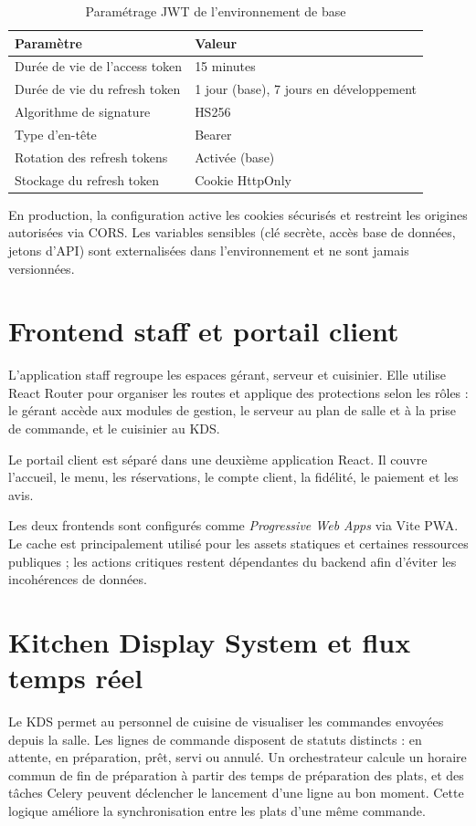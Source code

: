 \begin{table}[H]
\centering
\caption{Paramétrage JWT de l'environnement de base}
\begin{tabular}{p{6cm}p{7cm}}
\toprule
\textbf{Paramètre} & \textbf{Valeur} \\
\midrule
Durée de vie de l'access token & 15 minutes \\
Durée de vie du refresh token & 1 jour (base), 7 jours en développement \\
Algorithme de signature & HS256 \\
Type d'en-tête & Bearer \\
Rotation des refresh tokens & Activée (base) \\
Stockage du refresh token & Cookie HttpOnly \\
\bottomrule
\end{tabular}
\end{table}

En production, la configuration active les cookies sécurisés et restreint les origines autorisées via CORS. Les variables sensibles (clé secrète, accès base de données, jetons d'API) sont externalisées dans l'environnement et ne sont jamais versionnées.

\section{Frontend staff et portail client}
L'application staff regroupe les espaces gérant, serveur et cuisinier. Elle utilise React Router pour organiser les routes et applique des protections selon les rôles : le gérant accède aux modules de gestion, le serveur au plan de salle et à la prise de commande, et le cuisinier au KDS.

Le portail client est séparé dans une deuxième application React. Il couvre l'accueil, le menu, les réservations, le compte client, la fidélité, le paiement et les avis.

Les deux frontends sont configurés comme \emph{Progressive Web Apps} via Vite PWA. Le cache est principalement utilisé pour les assets statiques et certaines ressources publiques ; les actions critiques restent dépendantes du backend afin d'éviter les incohérences de données.

\section{Kitchen Display System et flux temps réel}
Le KDS permet au personnel de cuisine de visualiser les commandes envoyées depuis la salle. Les lignes de commande disposent de statuts distincts : en attente, en préparation, prêt, servi ou annulé. Un orchestrateur calcule un horaire commun de fin de préparation à partir des temps de préparation des plats, et des tâches Celery peuvent déclencher le lancement d'une ligne au bon moment. Cette logique améliore la synchronisation entre les plats d'une même commande.

